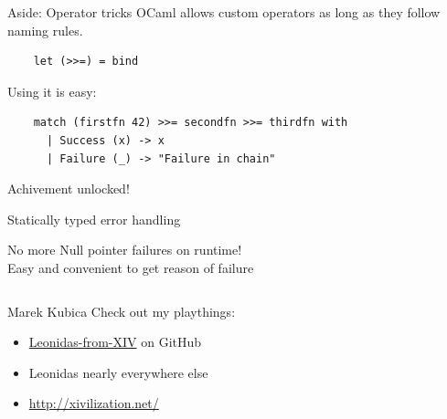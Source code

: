 \documentclass{beamer}
\renewcommand{\example}[1]{{\usebeamercolor[fg]{example text} #1}}
\begin{document}
\begin{frame}[fragile]{Aside: Operator tricks}
  OCaml allows \alert{custom operators} as long as they follow naming rules.

  \begin{verbatim}
    let (>>=) = bind
  \end{verbatim}

  Using it is \example{easy}:

  \begin{verbatim}
    match (firstfn 42) >>= secondfn >>= thirdfn with
      | Success (x) -> x
      | Failure (_) -> "Failure in chain"
  \end{verbatim}
\end{frame}

\begin{frame}{Achivement unlocked!}
  \begin{center}
    {\Huge Statically typed error handling}
  \end{center}
  \checkmark No more Null pointer failures on runtime!\\
  \checkmark Easy and convenient to get reason of failure
\end{frame}

{
%
\begin{frame}[plain]
  \begin{columns}
  \begin{block}{Marek Kubica}
    Check out my playthings:
    \begin{itemize}
      \item \href{https://github.com/Leonidas-from-XIV}{Leonidas-from-XIV} on GitHub
      \item Leonidas nearly everywhere else
      \item \url{http://xivilization.net/}
    \end{itemize}
  \end{block}
  \end{columns}
\end{frame}
}
\end{document}
